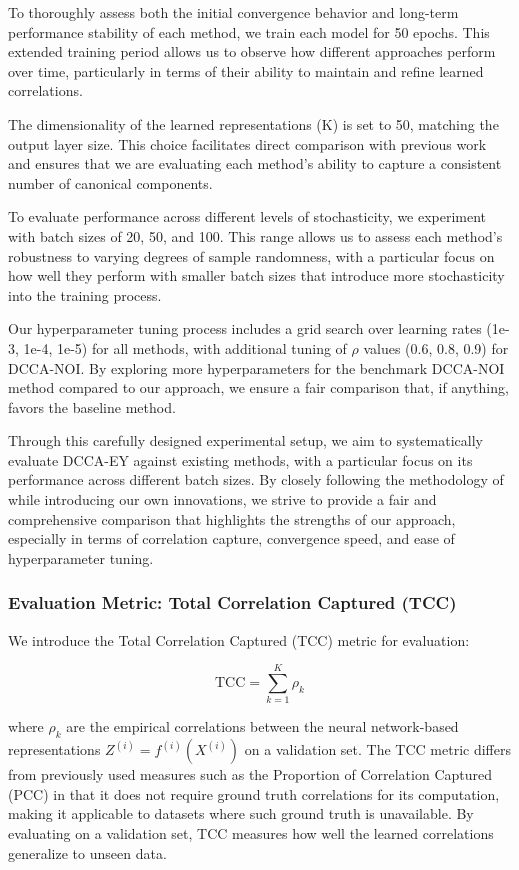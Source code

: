 To thoroughly assess both the initial convergence behavior and long-term performance stability of each method, we train each model for 50 epochs. This extended training period allows us to observe how different approaches perform over time, particularly in terms of their ability to maintain and refine learned correlations.

The dimensionality of the learned representations (K) is set to 50, matching the output layer size. This choice facilitates direct comparison with previous work and ensures that we are evaluating each method's ability to capture a consistent number of canonical components.

To evaluate performance across different levels of stochasticity, we experiment with batch sizes of 20, 50, and 100. This range allows us to assess each method's robustness to varying degrees of sample randomness, with a particular focus on how well they perform with smaller batch sizes that introduce more stochasticity into the training process.

Our hyperparameter tuning process includes a grid search over learning rates (1e-3, 1e-4, 1e-5) for all methods, with additional tuning of $\rho$ values (0.6, 0.8, 0.9) for DCCA-NOI. By exploring more hyperparameters for the benchmark DCCA-NOI method compared to our approach, we ensure a fair comparison that, if anything, favors the baseline method.

Through this carefully designed experimental setup, we aim to systematically evaluate DCCA-EY against existing methods, with a particular focus on its performance across different batch sizes. By closely following the methodology of \citet{wang2015stochastic} while introducing our own innovations, we strive to provide a fair and comprehensive comparison that highlights the strengths of our approach, especially in terms of correlation capture, convergence speed, and ease of hyperparameter tuning.

\subsubsection{Evaluation Metric: Total Correlation Captured (TCC)}
We introduce the Total Correlation Captured (TCC) metric for evaluation:

\[
    \text{TCC} = \sum_{k=1}^K \rho_k
\]

where $\rho_k$ are the empirical correlations between the neural network-based representations $Z^{(i)} = f^{(i)}(X^{(i)})$ on a validation set.
The TCC metric differs from previously used measures such as the Proportion of Correlation Captured (PCC) in that it does not require ground truth correlations for its computation, making it applicable to datasets where such ground truth is unavailable. By evaluating on a validation set, TCC measures how well the learned correlations generalize to unseen data.

